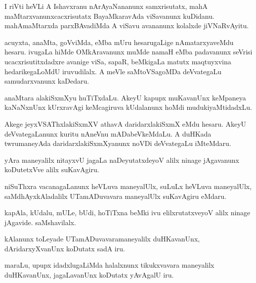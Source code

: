 \begin{mng}
I riVti heVLi A Ishavxranu nArAyaNananunx samxrisutatx, mahA maMtarxvanunxcacxrisutatx BayaMkaravAda viSavanunx kuDidanu. mahAmaMtarxda parxBAvadiMda A viSavu avananunx kolalxde jiVNaRvAyitu.
\end{mng}

\begin{mng}
acuyxta, anaMta, goVviMda, eMba mUru hesarugaLige nAmatarxyaveMdu hesaru. ivugaLa hiMde OMkAravanunx muMde namaH eMba padavanunx seVrisi ucacxrisutitxdadxre avanige viSa, sapaR, beMkigaLa matutx maqtuyxvina hedarikegaLoMdU iruvudilalx. A meVle saMtoVSagoMDa deVvategaLu samudarxvanunx kaDedaru.
\end{mng}

\begin{mng}
anaMtara alakiSxmXyu huTiTxdaLu. AkeyU kapupx muKavanUnx keMpaneya kaNaNxnUnx kUrxravAgi keMcagiruva kUdalanunx hoMdi mudukiyaMtidadxLu.
\end{mng}

\begin{mng}
Akege jeyxVSAThxlakiSxmXV athavA daridarxlakiSxmX eMdu hesaru. AkeyU deVvategaLanunx kuritu nAneVnu mADabeVkeMdaLu. A duHKada twrumaneyAda daridarxlakiSxmXyanunx noVDi deVvategaLu iMteMdaru.
\end{mng}

\begin{mng}
yAra maneyalilx nitayxvU jagaLa naDeyutatxdeyoV alilx ninage jAgavanunx koDutetxVve alilx suKavAgiru.
\end{mng}

\begin{mng}
niSuThxra vacanagaLanunx heVLuva maneyalUlx, suLuLx heVLuva maneyalUlx, saMdhAyxkAladalilx UTamADuvavara maneyalUlx suKavAgiru eMdaru.
\end{mng}

\begin{mng}
kapAla, kUdalu, mULe, bUdi, hoTiTxna beMki ivu elilxrutatxveyoV alilx ninage jAgavide. saMshavilalx.
\end{mng}

\begin{mng}
kAlanunx toLeyade UTamADuvavaramaneyalilx duHKavanUnx, dAridarxyXvanUnx koDutatx sadA iru.
\end{mng}

\begin{mng}
maraLu, upupx idadxlugaLiMda halalxnunx tikukxvavara maneyalilx duHKavanUnx, jagaLavanUnx koDutatx yAvAgalU iru.
\end{mng}

